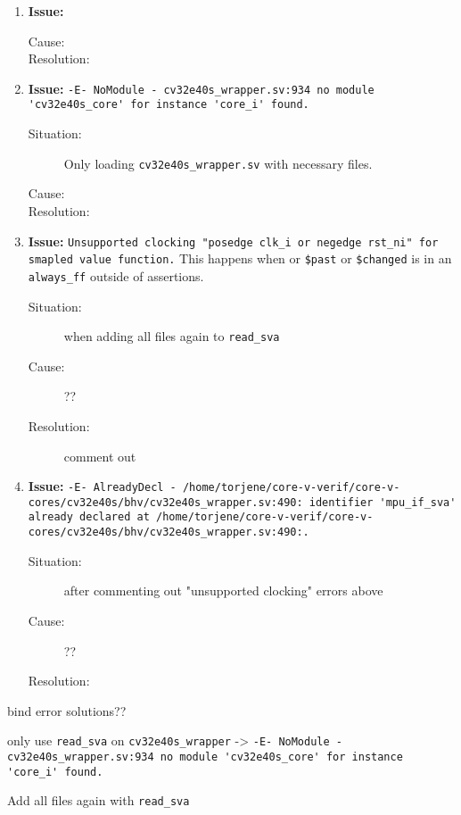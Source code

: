 \begin{enumerate}
\item \textbf{Issue:} 
  \begin{description}
    \item[Cause:] 
    \item[Resolution:] 
  \end{description}
  
\item \textbf{Issue:}  \lstinline{-E- NoModule - cv32e40s_wrapper.sv:934 no module 'cv32e40s_core' for instance 'core_i' found.}
  \begin{description}
    \item[Situation:] Only loading \lstinline{cv32e40s_wrapper.sv} with necessary files.
    \item[Cause:] 
    \item[Resolution:] 
  \end{description}
 
 

\item \textbf{Issue:} \lstinline{Unsupported clocking "posedge clk_i or negedge rst_ni" for smapled value function.} This happens when  or \lstinline{$past} or \lstinline{$changed} is in an \lstinline{always_ff} outside of assertions.
  \begin{description}
    \item[Situation:] when adding all files again to \lstinline{read_sva}
    \item[Cause:] ??
    \item[Resolution:] comment out 
  \end{description}
  
\item \textbf{Issue:} \lstinline{-E- AlreadyDecl - /home/torjene/core-v-verif/core-v-cores/cv32e40s/bhv/cv32e40s_wrapper.sv:490: identifier 'mpu_if_sva' already declared at /home/torjene/core-v-verif/core-v-cores/cv32e40s/bhv/cv32e40s_wrapper.sv:490:.}
  \begin{description}
    \item[Situation:] after commenting out "unsupported clocking" errors above
    \item[Cause:] ??
    \item[Resolution:] 
  \end{description}

  
\end{enumerate}

bind error solutions??

only use \lstinline{read_sva} on \lstinline{cv32e40s_wrapper} -> \lstinline{-E- NoModule - cv32e40s_wrapper.sv:934 no module 'cv32e40s_core' for instance 'core_i' found.}

Add all files again with \lstinline{read_sva}
